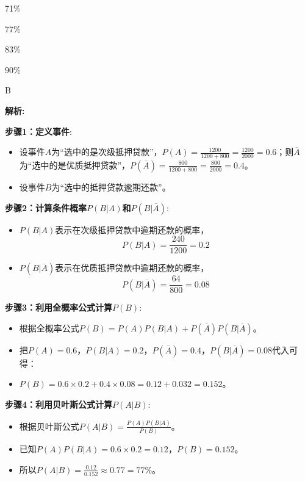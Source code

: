 \documentclass{article}
\newenvironment{explanation}
{\textbf{解析:}\par}
{\par}
\begin{document}
\begin{choices}
    \item 71\%
    \item 77\%
    \item 83\%
    \item 90\%
\end{choices}

\begin{correctanswer}
    B
\end{correctanswer}

\begin{explanation}
\textbf{步骤1：定义事件}:
    \begin{itemize}
        \item 设事件\(A\)为“选中的是次级抵押贷款”，\(P(A)=\frac{1200}{1200 + 800}=\frac{1200}{2000}=0.6\)；则\(\overline{A}\)为“选中的是优质抵押贷款”，\(P(\overline{A})=\frac{800}{1200 + 800}=\frac{800}{2000}=0.4\)。
        \item 设事件\(B\)为“选中的抵押贷款逾期还款”。
    \end{itemize}
\textbf{步骤2：计算条件概率\(P(B|A)\)和\(P(B|\overline{A})\)}:
    \begin{itemize}
        \item \(P(B|A)\)表示在次级抵押贷款中逾期还款的概率，\[P(B|A)=\frac{240}{1200}=0.2\]
        \item \(P(B|\overline{A})\)表示在优质抵押贷款中逾期还款的概率，\[P(B|\overline{A})=\frac{64}{800}=0.08\]
    \end{itemize}
\textbf{步骤3：利用全概率公式计算\(P(B)\)}:
    \begin{itemize}
        \item 根据全概率公式\(P(B)=P(A)P(B|A)+P(\overline{A})P(B|\overline{A})\)。
        \item 把\(P(A) = 0.6\)，\(P(B|A)=0.2\)，\(P(\overline{A}) = 0.4\)，\(P(B|\overline{A})=0.08\)代入可得：
        \item \(P(B)=0.6\times0.2+0.4\times0.08=0.12 + 0.032 = 0.152\)。
    \end{itemize}
\textbf{步骤4：利用贝叶斯公式计算\(P(A|B)\)}:
    \begin{itemize}
        \item 根据贝叶斯公式\(P(A|B)=\frac{P(A)P(B|A)}{P(B)}\)。
        \item 已知\(P(A)P(B|A)=0.6\times0.2 = 0.12\)，\(P(B)=0.152\)。
        \item 所以\(P(A|B)=\frac{0.12}{0.152}\approx0.77 = 77\%\)。
    \end{itemize}
\end{explanation}
\end{document}
